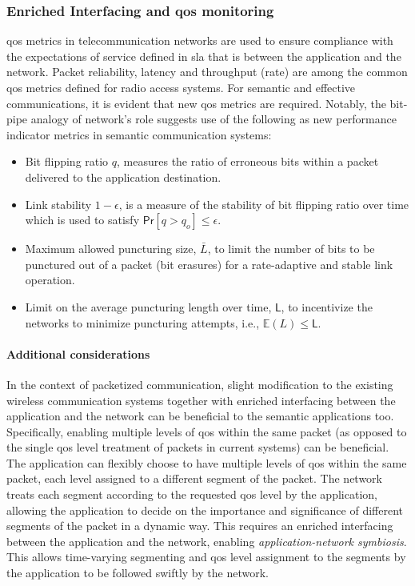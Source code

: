 \subsubsection{Enriched Interfacing and \gls{qos} monitoring} \label{sec:enrichedinterface}
\gls{qos} metrics in telecommunication networks are used to ensure compliance with the expectations of service defined in \gls{sla} that is between the application and the network. Packet reliability, latency and throughput (rate) are among the common \gls{qos} metrics defined for radio access systems. For semantic and effective communications, it is evident that new \gls{qos} metrics are required. Notably, the bit-pipe analogy of network's role suggests use of the following as new performance indicator metrics in semantic communication systems:
\begin{itemize}
    \item Bit flipping ratio $q$, measures the ratio of erroneous bits within a packet delivered to the application destination.
    \item Link stability $1 - \epsilon$, is a  measure of the stability of bit flipping ratio over time which is used to satisfy $\mathsf{Pr}[q > q_o] \leq \epsilon$.
    \item Maximum allowed puncturing size, $\bar{L}$, to limit the number of bits to be punctured out of a packet (bit erasures) for a rate-adaptive and stable link operation.
    \item Limit on the average puncturing length over time, $\mathsf{L}$, to incentivize the networks   to minimize puncturing attempts, i.e., $\mathbb{E} \left(  L\right) \leq \mathsf{L}$.
\end{itemize}
\paragraph*{Additional considerations} In the context of packetized communication, slight modification to the existing wireless communication systems together with enriched interfacing between the application and the network can be beneficial to the semantic applications too. Specifically, enabling multiple levels of \gls{qos} within the same packet   (as opposed to the single \gls{qos} level treatment of packets in current systems) can be beneficial. The application can flexibly choose to have multiple levels of \gls{qos} within the same packet, each level assigned to a different segment of  the packet. The network treats each segment according to the requested \gls{qos} level by the application, allowing the application to decide on the importance and significance of different segments of the packet in a dynamic way. This requires an enriched interfacing between the application and the network, enabling \emph{application-network symbiosis}. This allows time-varying segmenting and \gls{qos} level assignment to the segments by the application to be followed swiftly by the network.  

